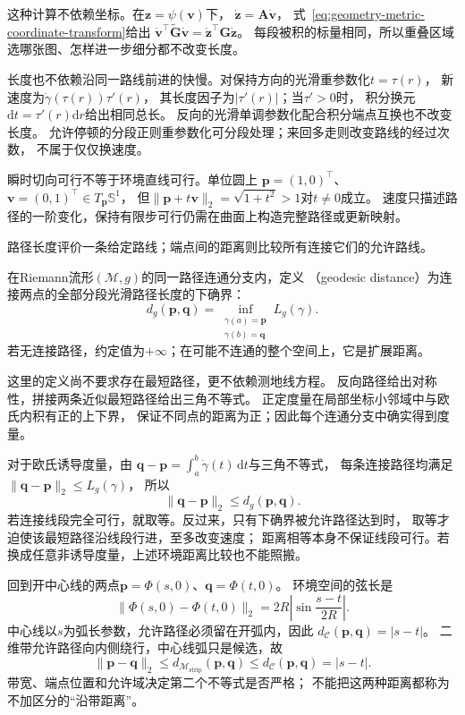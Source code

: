 这种计算不依赖坐标。在$\bm z=\psi(\bm v)$下，
$\dot{\bm z}=\bm A\dot{\bm v}$，
式~\eqref{eq:geometry-metric-coordinate-transform}给出
$\dot{\bm v}^\top\widetilde{\bm G}\dot{\bm v}
=\dot{\bm z}^\top\bm G\dot{\bm z}$。
每段被积的标量相同，所以重叠区域选哪张图、怎样进一步细分都不改变长度。

长度也不依赖沿同一路线前进的快慢。对保持方向的光滑重参数化$t=\tau(r)$，
新速度为$\dot\gamma(\tau(r))\tau'(r)$，
其长度因子为$|\tau'(r)|$；当$\tau'>0$时，
积分换元$\mathrm dt=\tau'(r)\mathrm dr$给出相同总长。
反向的光滑单调参数化配合积分端点互换也不改变长度。
允许停顿的分段正则重参数化可分段处理；来回多走则改变路线的经过次数，
不属于仅仅换速度。

瞬时切向可行不等于环境直线可行。单位圆上
$\bm p=(1,0)^\top$、$\bm v=(0,1)^\top\in T_{\bm p}\mathbb S^1$，
但$\lVert\bm p+t\bm v\rVert_2=\sqrt{1+t^2}>1$对$t\neq0$成立。
速度只描述路径的一阶变化，保持有限步可行仍需在曲面上构造完整路径或更新映射。


路径长度评价一条给定路线；端点间的距离则比较所有连接它们的允许路线。

\begin{definition}[测地距离]
\label{def:geometry-geodesic-distance}
在Riemann流形$(\mathcal M,g)$的同一路径连通分支内，定义
（geodesic distance）为连接两点的全部分段光滑路径长度的下确界：
\begin{equation}
 d_g(\bm p,\bm q)=
 \inf_{\substack{\gamma(a)=\bm p\\\gamma(b)=\bm q}}L_g(\gamma).
 \label{eq:geometry-geodesic-distance}
\end{equation}
若无连接路径，约定值为$+\infty$；在可能不连通的整个空间上，它是扩展距离。
\end{definition}
这里的定义尚不要求存在最短路径，更不依赖测地线方程。
反向路径给出对称性，拼接两条近似最短路径给出三角不等式。
正定度量在局部坐标小邻域中与欧氏内积有正的上下界，
保证不同点的距离为正；因此每个连通分支中确实得到度量。

对于欧氏诱导度量，由
$\bm q-\bm p=\int_a^b\dot\gamma(t)\,\mathrm dt$与三角不等式，
每条连接路径均满足$\lVert\bm q-\bm p\rVert_2\leq L_g(\gamma)$，
所以
\[
 \lVert\bm q-\bm p\rVert_2\leq d_g(\bm p,\bm q).
\]
若连接线段完全可行，就取等。反过来，只有下确界被允许路径达到时，
取等才迫使该最短路径沿线段行进，至多改变速度；
距离相等本身不保证线段可行。若换成任意非诱导度量，上述环境距离比较也不能照搬。

回到开中心线的两点$\bm p=\Phi(s,0)$、$\bm q=\Phi(t,0)$。
环境空间的弦长是
\begin{equation}
 \lVert\Phi(s,0)-\Phi(t,0)\rVert_2
 =2R\left|\sin\frac{s-t}{2R}\right|.
 \label{eq:geometry-strip-chord-distance}
\end{equation}
中心线以$s$为弧长参数，允许路径必须留在开弧内，因此
$d_{\mathcal C}(\bm p,\bm q)=|s-t|$。
二维带允许路径向内侧绕行，中心线弧只是候选，故
\[
 \lVert\bm p-\bm q\rVert_2
 \leq d_{\mathcal M_{\mathrm{strip}}}(\bm p,\bm q)
 \leq d_{\mathcal C}(\bm p,\bm q)=|s-t|.
\]
带宽、端点位置和允许域决定第二个不等式是否严格；
不能把这两种距离都称为不加区分的“沿带距离”。

